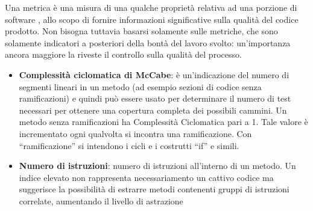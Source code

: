 Una metrica è una misura di una qualche proprietà relativa ad una porzione di
software , allo scopo di fornire informazioni significative sulla qualità del codice
prodotto. Non bisogna tuttavia basarsi solamente sulle metriche, che sono solamente
indicatori a posteriori della bontà del lavoro svolto: un'importanza ancora maggiore
la riveste il controllo sulla qualità del processo.
\begin{itemize}


\item \textbf{Complessità  ciclomatica di McCabe}: è un'indicazione del numero di segmenti lineari in un metodo (ad esempio sezioni di codice senza ramificazioni) e quindi può essere usato per determinare il numero di test necessari per ottenere una copertura completa dei possibili cammini. Un metodo senza ramificazioni ha Complessità Ciclomatica pari a 1. Tale valore è incrementato ogni qualvolta si incontra una ramificazione. Con “ramificazione” si intendono i cicli e i costrutti “if” e simili.

\item \textbf{Numero di istruzioni}: numero di istruzioni all'interno di un metodo. Un
indice elevato non rappresenta necessariamento un cattivo codice ma suggerisce la possibilità di estrarre metodi contenenti gruppi di istruzioni correlate, aumentando il livello di astrazione
\end{itemize}